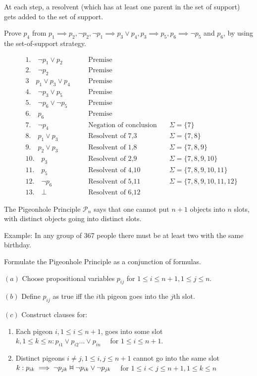 \documentclass{article}
\newcommand{\vDashv}{%
  \mathrel{%
    \text{%
      \ooalign{$\vDash$\cr\reflectbox{$\vDash$}\cr}%
    }%
  }%
}
\begin{document}
At each step, a resolvent (which has at least one parent in the set of support) gets added to the set of support.



Prove $p_4$ from $p_1 \implies p_2, \neg p_2, \neg p_1 \implies p_3 \vee p_4, p_3 \implies p_5, p_6 \implies \neg p_5$ and $p_6$, by using the set-of-support strategy.


\begin{align*}
&1.\quad \neg p_1 \vee p_2 \quad &&\text{Premise} \\
&2.\quad \neg p_2 \quad &&\text{Premise} \\ 
&3 \quad p_1 \vee p_3 \vee p_4 \quad &&\text{Premise} \\ 
&4.\quad \neg p_3 \vee p_5  \quad &&\text{Premise} \\ 
&5.\quad \neg p_6 \vee \neg p_5  \quad &&\text{Premise} \\ 
&6.\quad p_6 \quad &&\text{Premise} \\
&7.\quad \neg p_4 \quad &&\text{Negation of conclusion} \quad &\Sigma = \{7\} \\
&8.\quad p_1 \vee p_3 \quad &&\text{Resolvent of 7,3} \quad &\Sigma = \{7,8\} \\
&9.\quad p_2 \vee p_3 \quad &&\text{Resolvent of 1,8} \quad &\Sigma = \{7,8,9\} \\
&10.\quad p_3 \quad &&\text{Resolvent of 2,9} \quad &\Sigma = \{7,8,9,10\} \\
&11.\quad p_5 \quad &&\text{Resolvent of 4,10} \quad &\Sigma = \{7,8,9,10,11\} \\
&12.\quad \neg p_6 \quad &&\text{Resolvent of 5,11} \quad &\Sigma = \{7,8,9,10,11,12\} \\
&13.\quad \bot \quad &&\text{Resolvent of 6,12}
\end{align*}

The Pigeonhole Principle $\mathcal{P}_n$ says that one cannot put $n+1$ objects into $n$ slots, with distinct objects going into distinct slots.

Example: In any group of 367 people there must be at least two with the same birthday.

Formulate the Pigeonhole Principle as a conjunction of formulas.

$(a)$ Choose propositional variables $p_{ij}$ for $1 \le i \le n +1, 1 \le j \le n$. 

$(b)$ Define $p_{ij}$ as true iff the $i$th pigeon goes into the $j$th slot.

$(c)$ Construct clauses for:
\begin{enumerate}
    \item Each pigeon $i, 1 \le i \le n+1$, goes into some slot $k, 1 \le k \le n: p_{i1} \vee p_{i2} \ldots \vee p_{in} \quad$ for $1 \le i \le n+1$.
    \item Distinct pigeons $i \ne j, 1 \le i, j \le n+1$ cannot go into the same slot $k: p_{ik} \implies \neg p_{jk} \vDashv \neg p_{ik} \vee \neg p_{jk} \quad$ for $1 \le i < j \le n +1, 1 \le k \le n$
\end{enumerate}
\end{document}
